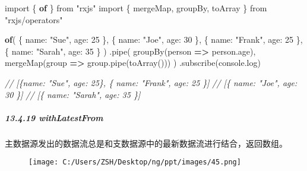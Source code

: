 \documentclass[
]{article}
\newenvironment{Shaded}{}{}
\newcommand{\AttributeTok}[1]{\textcolor[rgb]{0.49,0.56,0.16}{#1}}
\newcommand{\BuiltInTok}[1]{#1}
\newcommand{\CommentTok}[1]{\textcolor[rgb]{0.38,0.63,0.69}{\textit{#1}}}
\newcommand{\DataTypeTok}[1]{\textcolor[rgb]{0.56,0.13,0.00}{#1}}
\newcommand{\DecValTok}[1]{\textcolor[rgb]{0.25,0.63,0.44}{#1}}
\newcommand{\FunctionTok}[1]{\textcolor[rgb]{0.02,0.16,0.49}{#1}}
\newcommand{\ImportTok}[1]{#1}
\newcommand{\KeywordTok}[1]{\textcolor[rgb]{0.00,0.44,0.13}{\textbf{#1}}}
\newcommand{\NormalTok}[1]{#1}
\newcommand{\OperatorTok}[1]{\textcolor[rgb]{0.40,0.40,0.40}{#1}}
\newcommand{\StringTok}[1]{\textcolor[rgb]{0.25,0.44,0.63}{#1}}
\begin{document}
\begin{Shaded}
\begin{Highlighting}[]
\ImportTok{import}\NormalTok{ \{ }\KeywordTok{of}\NormalTok{ \} }\ImportTok{from} \StringTok{"rxjs"}
\ImportTok{import}\NormalTok{ \{ mergeMap}\OperatorTok{,}\NormalTok{ groupBy}\OperatorTok{,}\NormalTok{ toArray \} }\ImportTok{from} \StringTok{"rxjs/operators"}

\KeywordTok{of}\NormalTok{(}
\NormalTok{  \{ }\DataTypeTok{name}\OperatorTok{:} \StringTok{"Sue"}\OperatorTok{,} \DataTypeTok{age}\OperatorTok{:} \DecValTok{25}\NormalTok{ \}}\OperatorTok{,}
\NormalTok{  \{ }\DataTypeTok{name}\OperatorTok{:} \StringTok{"Joe"}\OperatorTok{,} \DataTypeTok{age}\OperatorTok{:} \DecValTok{30}\NormalTok{ \}}\OperatorTok{,}
\NormalTok{  \{ }\DataTypeTok{name}\OperatorTok{:} \StringTok{"Frank"}\OperatorTok{,} \DataTypeTok{age}\OperatorTok{:} \DecValTok{25}\NormalTok{ \}}\OperatorTok{,}
\NormalTok{  \{ }\DataTypeTok{name}\OperatorTok{:} \StringTok{"Sarah"}\OperatorTok{,} \DataTypeTok{age}\OperatorTok{:} \DecValTok{35}\NormalTok{ \}}
\NormalTok{)}
  \OperatorTok{.}\FunctionTok{pipe}\NormalTok{(}
    \FunctionTok{groupBy}\NormalTok{(person }\KeywordTok{=\textgreater{}}\NormalTok{ person}\OperatorTok{.}\AttributeTok{age}\NormalTok{)}\OperatorTok{,}
    \FunctionTok{mergeMap}\NormalTok{(group }\KeywordTok{=\textgreater{}}\NormalTok{ group}\OperatorTok{.}\FunctionTok{pipe}\NormalTok{(}\FunctionTok{toArray}\NormalTok{()))}
\NormalTok{  )}
  \OperatorTok{.}\FunctionTok{subscribe}\NormalTok{(}\BuiltInTok{console}\OperatorTok{.}\FunctionTok{log}\NormalTok{)}

\CommentTok{// [\{name: "Sue", age: 25\}, \{ name: "Frank", age: 25 \}]}
\CommentTok{// [\{ name: "Joe", age: 30 \}]}
\CommentTok{// [\{ name: "Sarah", age: 35 \}]}
\end{Highlighting}
\end{Shaded}

\hypertarget{13419-withlatestfrom}{%
\subparagraph{13.4.19 withLatestFrom}\label{13419-withlatestfrom}}

主数据源发出的数据流总是和支数据源中的最新数据流进行结合，返回数组。

\begin{figure}
\centering
\texttt{[image: C:/Users/ZSH/Desktop/ng/ppt/images/45.png]}
\caption{}
\end{figure}
\end{document}
